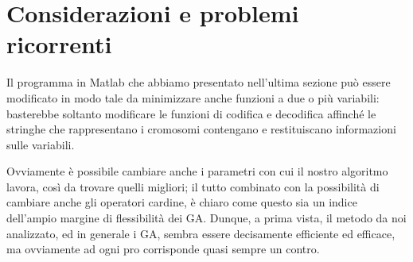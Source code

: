 \section{Considerazioni e problemi ricorrenti}
Il programma in Matlab che abbiamo presentato nell'ultima sezione pu\`o essere modificato in modo tale da minimizzare anche funzioni a due o pi\`u variabili: basterebbe soltanto modificare le funzioni di codifica e decodifica affinch\'e le stringhe che rappresentano i cromosomi contengano e restituiscano informazioni sulle variabili.

Ovviamente \`e possibile cambiare anche i parametri con cui il nostro algoritmo lavora, cos\`i da trovare quelli migliori; il tutto combinato con la possibilit\`a di cambiare anche gli operatori cardine, \`e chiaro come questo sia un indice dell'ampio margine di flessibilit\`a dei GA.
Dunque, a prima vista, il metodo da noi analizzato, ed in generale i GA, sembra essere decisamente efficiente ed efficace, ma ovviamente ad ogni pro corrisponde quasi sempre un contro.

